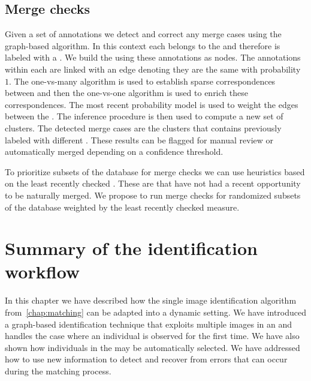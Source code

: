     \subsection{Merge checks}
        Given a set of annotations we detect and correct any merge cases using
          the graph-based algorithm.
        In this context each \annot{} belongs to the \masterdatabase{} and
          therefore is labeled with a \name{}.
        We build the \idengraph{} using these annotations as nodes.
        The annotations within each \name{} are linked with an edge denoting
          they are the same with probability $1$.
        The one-vs-many algorithm is used to establish sparse correspondences
          between \names{} and then the one-vs-one algorithm is used to enrich
          these correspondences.
        The most recent probability model is used to weight the edges between
          the \names{}.
        The inference procedure is then used to compute a new set of clusters.
        The detected merge cases are the clusters that contains \annots{}
          previously labeled with different \names{}.
        These results can be flagged for manual review or automatically merged
          depending on a confidence threshold.

        To prioritize subsets of the database for merge checks we can use
          heuristics based on the least recently checked \names{}.
        These are \names{} that have not had a recent opportunity to be
          naturally merged.
        We propose to run merge checks for randomized subsets of the database
          weighted by the least recently checked measure.

\section{Summary of the identification workflow}\label{sec:summary4}
    In this chapter we have described how the single image identification
      algorithm from~\cref{chap:matching} can be adapted into a dynamic setting.
    We have introduced a graph-based identification technique that exploits
      multiple images in an \encounter{} and handles the case where an
      individual is observed for the first time.
    We have also shown how \exemplar{} individuals in the \masterdatabase{}
      may be automatically selected.
    We have addressed how to use new information to detect and recover from
      errors that can occur during the matching process.

